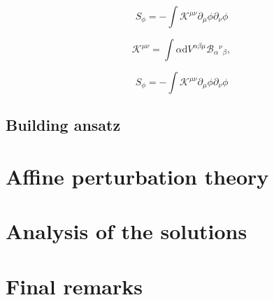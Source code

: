 \documentclass{article}
\begin{document}
\begin{equation}
    \label{PAG_4D_scalar_field}
    S_\phi = -\int \mathcal{K}^{\mu\nu}\partial_\mu \phi\partial_\nu \phi
\end{equation}

\begin{equation}
    \mathcal{K}^{\mu\nu} = \int\alpha \mathrm{d}V^{\alpha\beta\mu}\mathcal{B}_{\alpha}{}^{\nu}{}_{\beta},
\end{equation}

\begin{equation}
    \label{PAG_3D_scalar_field}
    S_\phi = -\int \mathcal{K}^{\mu\nu}\partial_\mu \phi\partial_\nu \phi
\end{equation}

\subsection{Building ansatz}
\label{subsec:building ansatz}

\section{Affine perturbation theory}
\label{sec:affine perturbations}

\section{Analysis of the solutions}
\label{subsec:solutions}

\section{Final remarks}
\label{sec:final remarks}





\end{document}
